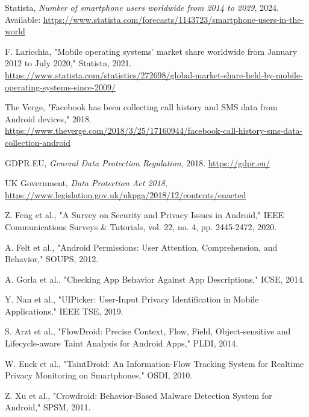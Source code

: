 \documentclass[a4paper,12pt]{report}
\begin{document}
\begin{thebibliography}{99}
     Statista, \textit{Number of smartphone users worldwide from 2014 to 2029}, 2024. Available: \url{https://www.statista.com/forecasts/1143723/smartphone-users-in-the-world}

     F. Laricchia, "Mobile operating systems’ market share worldwide from January 2012 to July 2020," Statista, 2021. \url{https://www.statista.com/statistics/272698/global-market-share-held-by-mobile-operating-systems-since-2009/}

     The Verge, "Facebook has been collecting call history and SMS data from Android devices," 2018. \url{https://www.theverge.com/2018/3/25/17160944/facebook-call-history-sms-data-collection-android}

     GDPR.EU, \textit{General Data Protection Regulation}, 2018. \url{https://gdpr.eu/}

     UK Government, \textit{Data Protection Act 2018}, \url{https://www.legislation.gov.uk/ukpga/2018/12/contents/enacted}

     Z. Feng et al., "A Survey on Security and Privacy Issues in Android," IEEE Communications Surveys \& Tutorials, vol. 22, no. 4, pp. 2445-2472, 2020.

     A. Felt et al., "Android Permissions: User Attention, Comprehension, and Behavior," SOUPS, 2012.

     A. Gorla et al., "Checking App Behavior Against App Descriptions," ICSE, 2014.

     Y. Nan et al., "UIPicker: User-Input Privacy Identification in Mobile Applications," IEEE TSE, 2019.

     S. Arzt et al., "FlowDroid: Precise Context, Flow, Field, Object-sensitive and Lifecycle-aware Taint Analysis for Android Apps," PLDI, 2014.

     W. Enck et al., "TaintDroid: An Information-Flow Tracking System for Realtime Privacy Monitoring on Smartphones," OSDI, 2010.

     Z. Xu et al., "Crowdroid: Behavior-Based Malware Detection System for Android," SPSM, 2011.


\end{thebibliography}
\end{document}
